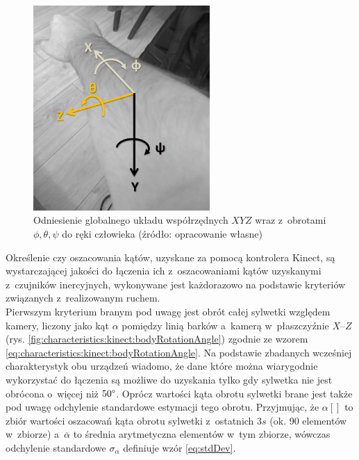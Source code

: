 \begin{savenotes}
	\begin{figure}[!htb]
		\centering	
		\includegraphics[width=0.6\textwidth]{images/handAxes.jpg}	
		\caption{Odniesienie globalnego układu współrzędnych $XYZ$ wraz z~obrotami $\phi , \theta , \psi$ do ręki człowieka (źródło: opracowanie własne)}
		\label{fig:handAxes}
	\end{figure}
\end{savenotes}
												
Określenie czy oszacowania kątów, uzyskane za pomocą kontrolera Kinect, są wystarczającej jakości do łączenia ich z~oszacowaniami kątów uzyskanymi z~czujników inercyjnych, wykonywane jest każdorazowo na podstawie kryteriów związanych z~realizowanym ruchem. \\
Pierwszym kryterium branym pod uwagę jest obrót całej sylwetki względem kamery, liczony jako kąt $\alpha$ pomiędzy linią barków a~kamerą w~płaszczyźnie $X$--$Z$ (rys. \ref{fig:characteristics:kinect:bodyRotationAngle}) zgodnie ze wzorem \ref{eq:characteristics:kinect:bodyRotationAngle}. Na podstawie zbadanych wcześniej charakterystyk obu urządzeń wiadomo, że dane które można wiarygodnie wykorzystać do łączenia są możliwe do uzyskania tylko gdy sylwetka nie jest obrócona o~więcej niż $50\degree$. Oprócz wartości kąta obrotu sylwetki brane jest także pod uwagę odchylenie standardowe estymacji tego obrotu. Przyjmując, że $\alpha[]$ to zbiór wartości oszacowań kąta obrotu sylwetki z~ostatnich $3s$ (ok. 90 elementów w~zbiorze) a~$\overline{\alpha}$ to średnia arytmetyczna elementów w~tym zbiorze, wówczas odchylenie standardowe $\sigma_\alpha$ definiuje wzór \ref{eq:stdDev}.
												

